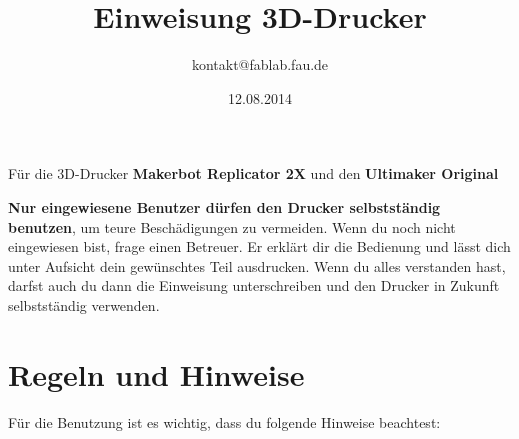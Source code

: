 \documentclass{\basedir/fablab-document}
\date{12.08.2014}
\author{kontakt@fablab.fau.de}
\title{Einweisung 3D-Drucker}
\begin{document}
\maketitle
\begin{center}
	Für die 3D-Drucker \textbf{Makerbot Replicator 2X} und den \textbf{Ultimaker Original}
\end{center}

\textbf{Nur eingewiesene Benutzer dürfen den Drucker selbstständig benutzen}, um teure Beschädigungen zu vermeiden. Wenn du noch nicht eingewiesen bist, frage einen Betreuer. Er erklärt dir die Bedienung und lässt dich unter Aufsicht dein gewünschtes Teil ausdrucken. Wenn du alles verstanden hast, darfst auch du dann die Einweisung unterschreiben und den Drucker in Zukunft selbstständig verwenden.

\section{Regeln und Hinweise}
Für die Benutzung ist es wichtig, dass du folgende Hinweise beachtest:
\end{document}
